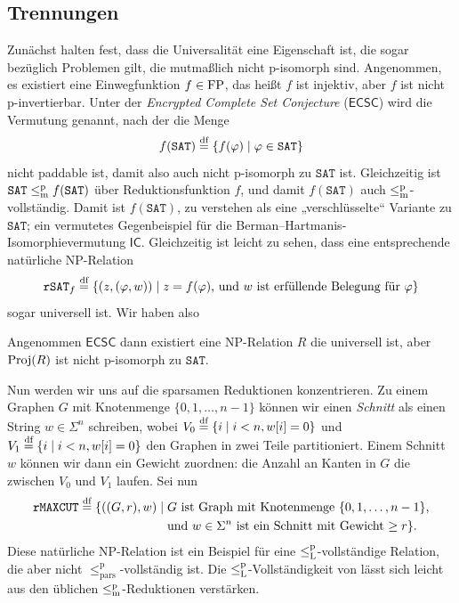 \subsection*{Trennungen}

Zunächst halten \textcite{agrawal_universal_1992} fest, dass die Universalität eine Eigenschaft ist, die sogar bezüglich Problemen gilt, die mutmaßlich nicht p-isomorph sind.
Angenommen, es existiert eine Einwegfunktion $f\in\mathrm{FP}$, das heißt $f$ ist injektiv, aber $f$ ist nicht p-invertierbar.
Unter der \emph{Encrypted Complete Set Conjecture} ($\mathsf{ECSC}$) wird die Vermutung genannt, nach der die Menge
\[ f(\mathtt{SAT}) \stackrel{\text{df}}{=} \{ f(\varphi) \mid \varphi\in\mathtt{SAT} \} \]
nicht paddable ist, damit also auch nicht p-isomorph zu $\mathtt{SAT}$ ist.
Gleichzeitig ist $\mathtt{SAT}\leq_\mathrm{m}^\mathrm{p} f(\mathtt{SAT})$ über Reduktionsfunktion $f$, und damit $f(\mathtt{SAT})$ auch $\leq_\mathrm{m}^\mathrm{p}$-vollständig.
Damit ist $f(\mathtt{SAT})$, zu verstehen als eine „verschlüsselte“ Variante zu $\mathtt{SAT}$; ein vermutetes Gegenbeispiel für die Berman--Hartmanis-Isomorphievermutung $\mathsf{IC}$.
Gleichzeitig ist leicht zu sehen, dass eine entsprechende natürliche NP-Relation
\[ \mathtt{rSAT}_f \stackrel{\text{df}}{=} \{ (z, (\varphi, w)) \mid \text{$z=f(\varphi)$, und $w$ ist erfüllende Belegung für $\varphi$} \} \]
sogar universell ist.
Wir haben also %
\begin{observation}
    Angenommen $\mathsf{ECSC}$ dann existiert eine NP-Relation $R$ die universell ist, aber $\operatorname{Proj}(R)$ ist nicht p-isomorph zu $\mathtt{SAT}$.
\end{observation}


Nun werden wir uns auf die sparsamen Reduktionen konzentrieren.
Zu einem Graphen $G$ mit Knotenmenge $\{0,1,\dots, n-1\}$ können wir einen \emph{Schnitt} als einen String $w\in\Sigma^n$ schreiben, wobei $V_0 \stackrel{\text{df}}{=} \{ i \mid i<n, w[i]=0\}$ und $V_1 \stackrel{\text{df}}{=} \{ i \mid i<n, w[i]=0\}$ den Graphen in zwei Teile partitioniert. Einem Schnitt $w$ können wir dann ein Gewicht zuordnen: die Anzahl an Kanten in $G$ die zwischen $V_0$ und $V_1$ laufen.
Sei nun
\[ \begin{split} \mathtt{rMAXCUT} \stackrel{\text{df}}{=} \{ ((G, r), w) \mid {}&\text{$G$ ist Graph mit Knotenmenge $\{0,1,\dots,n-1\}$,} \\ &\text{und $w\in\Sigma^n$ ist ein Schnitt mit Gewicht $\geq r$} \}.\end{split} \]
Diese natürliche NP-Relation ist ein Beispiel für eine $\leq_\mathrm{L}^\mathrm{p}$-vollständige Relation, die aber nicht $\leq_\mathrm{pars}^\mathrm p$-vollständig ist. Die $\leq_\mathrm{L}^\mathrm{p}$-Vollständigkeit von lässt sich leicht aus den üblichen $\leq_\mathrm{m}^\mathrm{p}$-Reduktionen verstärken.

